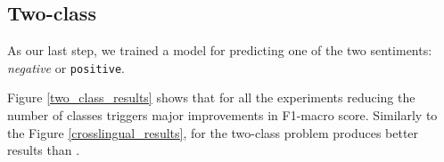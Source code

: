 \subsection{Two-class}
As our last step, we trained a model for predicting one of the two sentiments: {\it negative} or {\tt positive}. 

Figure \ref{two_class_results} shows that for all the experiments reducing the number of classes triggers major improvements in F1-macro score. Similarly to the Figure \ref{crosslingual_results}, for the two-class problem \taskDE produces better results than \taskEN.